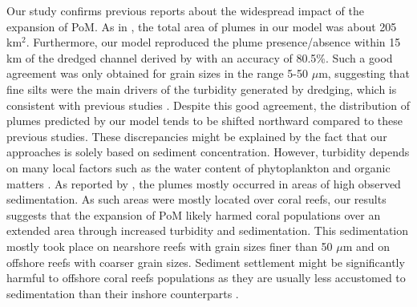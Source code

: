 \documentclass[preprint,12pt,authoryear]{elsarticle}
\begin{document}
Our study confirms previous reports about the widespread impact of the expansion of PoM. As in \cite{barnes2015sediment}, the total area of plumes in our model was about 205 km$^2$. Furthermore, our model reproduced the plume presence/absence within 15 km of the dredged channel derived by \cite{cunning2019extensive} with an accuracy of 80.5\%. Such a good agreement was only obtained for grain sizes in the range 5-50 $\mu$m, suggesting that fine silts were the main drivers of the turbidity generated by dredging, which is consistent with previous studies \citep{storlazzi2015influence,fourney2017additive}. Despite this good agreement, the distribution of plumes predicted by our model tends to be shifted northward compared to these previous studies. These discrepancies might be explained by the fact that our approaches is solely based on sediment concentration. However, turbidity depends on many local factors such as the water content of phytoplankton and organic matters \citep{gray2000comparability,thackston2000improved}. As reported by \cite{cunning2019extensive}, the plumes mostly occurred in areas of high observed sedimentation. As such areas were mostly located over coral reefs, our results suggests that the expansion of PoM likely harmed coral populations over an extended area through increased turbidity and sedimentation. This sedimentation mostly took place on nearshore reefs with grain sizes finer than 50 $\mu$m and on offshore reefs with coarser grain sizes. Sediment settlement might be significantly harmful to offshore coral reefs populations as they are usually less accustomed to sedimentation than their inshore  counterparts \citep{wolanski2005fine}.
\end{document}
